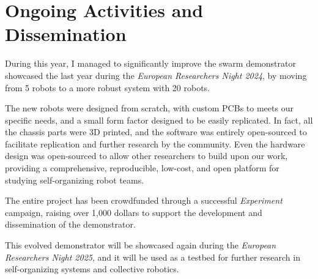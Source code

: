 \documentclass[runningheads]{llncs}
\begin{document}
\section{Ongoing Activities and Dissemination}

During this year,
I managed to significantly improve the swarm demonstrator showcased the last year during the \emph{European Researchers Night 2024},
by moving from 5 robots to a more robust system with 20 robots.

The new robots were designed from scratch,
with custom PCBs to meets our specific needs,
and a small form factor designed to be easily replicated.
%
In fact,
all the chassis parts were 3D printed,
and the software was entirely open-sourced to facilitate replication and further research by the community.
%
Even the hardware design was open-sourced to allow other researchers to build upon our work,
providing a comprehensive, reproducible, low-cost, and open platform for studying self-organizing robot teams.

The entire project has been crowdfunded through a successful \emph{Experiment}~\cite{GianlucaAguzzi2025} campaign,
raising over 1,000 dollars to support the development and dissemination of the demonstrator.

This evolved demonstrator will be showcased again during the \emph{European Researchers Night 2025},
and it will be used as a testbed for further research in self-organizing systems and collective
robotics.



\end{document}
